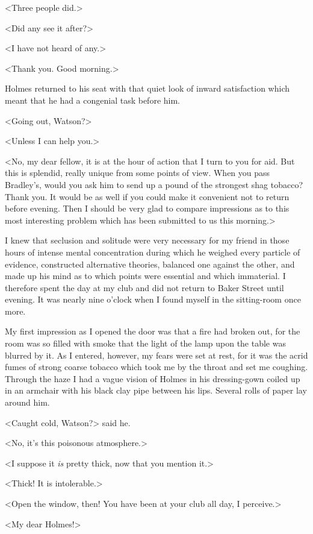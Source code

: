 <Three people did.>

<Did any see it after?>

<I have not heard of any.>

<Thank you. Good morning.>

Holmes returned to his seat with that quiet look of inward satisfaction which meant that he had a congenial task before him.

<Going out, Watson?>

<Unless I can help you.>

<No, my dear fellow, it is at the hour of action that I turn to you for aid. But this is splendid, really unique from some points of view. When you pass Bradley's, would you ask him to send up a pound of the strongest shag tobacco? Thank you. It would be as well if you could make it convenient not to return before evening. Then I should be very glad to compare impressions as to this most interesting problem which has been submitted to us this morning.>

I knew that seclusion and solitude were very necessary for my friend in those hours of intense mental concentration during which he weighed every particle of evidence, constructed alternative theories, balanced one against the other, and made up his mind as to which points were essential and which immaterial. I therefore spent the day at my club and did not return to Baker Street until evening. It was nearly nine o'clock when I found myself in the sitting-room once more.

My first impression as I opened the door was that a fire had broken out, for the room was so filled with smoke that the light of the lamp upon the table was blurred by it. As I entered, however, my fears were set at rest, for it was the acrid fumes of strong coarse tobacco which took me by the throat and set me coughing. Through the haze I had a vague vision of Holmes in his dressing-gown coiled up in an armchair with his black clay pipe between his lips. Several rolls of paper lay around him.

<Caught cold, Watson?> said he.

<No, it's this poisonous atmosphere.>

<I suppose it \emph{is} pretty thick, now that you mention it.>

<Thick! It is intolerable.>

<Open the window, then! You have been at your club all day, I perceive.>

<My dear Holmes!>

